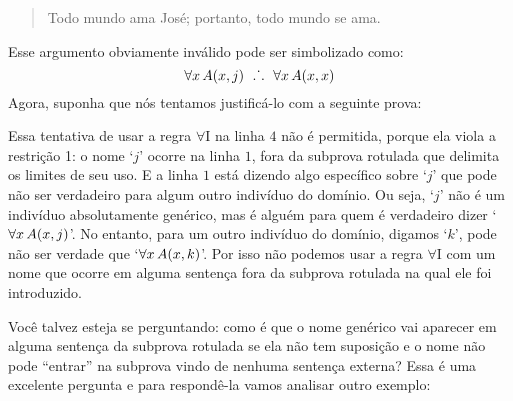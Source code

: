 	\begin{quote}
		Todo mundo ama José; portanto, todo mundo se ama.
	\end{quote}
Esse argumento obviamente inválido pode ser simbolizado como:
$$\forall x\,\mathord{A}(x,j) \ \mathrel{\ldotp\dot{}\,\ldotp} \ \forall x\,\mathord{A}(x,x)$$
Agora, suponha que nós tentamos justificá-lo com a seguinte prova:
\begin{fitchproof}
	\open
		 
	\close
	 
\end{fitchproof}\noindent
Essa tentativa de usar a regra $\forall$I na linha $4$ não é permitida, porque ela viola a restrição 1:
o nome `$j$' ocorre na linha $1$, fora da subprova rotulada que delimita os limites de seu uso.
E a linha $1$ está dizendo algo específico sobre `$j$' que pode não ser verdadeiro para algum outro indivíduo do domínio.
Ou seja, `$j$' não é um indivíduo absolutamente genérico, mas é alguém para quem é verdadeiro dizer  `$\forall x\, \mathord{A}(x,j)$'.
No entanto, para um outro indivíduo do domínio, digamos `$k$', pode não ser verdade que `$\forall x\, \mathord{A}(x,k)$'.
Por isso não podemos usar a regra $\forall$I com um nome que ocorre em alguma sentença fora da subprova rotulada na qual ele foi introduzido.


Você talvez esteja se perguntando: como é que o nome genérico vai aparecer em alguma sentença da subprova rotulada se ela não tem suposição e o nome não pode ``entrar'' na subprova vindo de nenhuma sentença externa?
Essa é uma excelente pergunta e para respondê-la vamos analisar outro exemplo:

